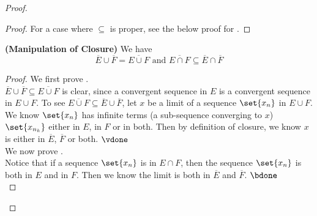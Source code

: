 \documentclass{report}
\begin{document}
\begin{proof}
\begin{proof}
For a case where $\subseteq$ is proper, see the below proof for .
\end{proof}
\begin{theorem}
\label{3.2.4}
\textbf{(Manipulation of Closure)} We have
\begin{equation*}
\overline{E}\cup \overline{F}=\overline{E\cup F}\text{ and }\overline{E\cap F}\subseteq \overline{E}\cap \overline{F}
\end{equation*}
\end{theorem}
\begin{proof}
We first prove .\\

$\overline{E}\cup \overline{F}\subseteq \overline{E\cup F}$ is clear, since a convergent sequence in $E$ is a convergent sequence in $E\cup F$. To see $\overline{E\cup F}\subseteq \overline{E}\cup \overline{F}$, let $x$ be a limit of a sequence  $\set{x_n}$ in $E\cup F$. We know $\set{x_n}$ has infinite terms (a sub-sequence converging to $x$) $\set{x_{n_k}}$ either in $E$, in $F$ or in both. Then by definition of closure, we know $x$ is either in $\overline{E}$, $\overline{F}$ or both. $\vdone$\\


We now prove .\\

Notice that if a sequence $\set{x_n}$ is in $E\cap F$, then the sequence $\set{x_n}$ is both in $E$ and in $F$. Then we know the limit is both in  $\overline{E}$ and $\overline{F}$. $\bdone$\\


\end{proof}
\end{proof}
\end{document}
